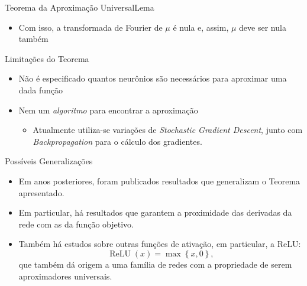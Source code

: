 \documentclass[13pt]{beamer}
\begin{document}
\begin{frame}{Teorema da Aproximação Universal}{Lema}
    \begin{itemize}
        \item Com isso, a transformada de Fourier de \( \mu \) é nula e, assim, \( \mu \) deve ser nula também
    \end{itemize}
\end{frame}


\begin{frame}{Limitações do Teorema}
    \begin{itemize}
        \item<1-> Não é especificado quantos neurônios são necessários para aproximar uma dada função
        \item<2-> Nem um \emph{algoritmo} para encontrar a aproximação
            \begin{itemize}
                \item<3-> Atualmente utiliza-se variações de \emph{Stochastic Gradient Descent}, junto com \emph{Backpropagation} para o cálculo dos gradientes.
            \end{itemize}
    \end{itemize}
\end{frame}


\begin{frame}{Possíveis Generalizações}
    \begin{itemize}
        \item<1-> Em anos posteriores, foram publicados resultados que generalizam o Teorema apresentado.
        \item<2-> Em particular, há resultados que garantem a proximidade das derivadas da rede com as da função objetivo.
        \item<3-> Também há estudos sobre outras funções de ativação, em particular, a ReLU:
            \begin{equation*}
                \operatorname{ReLU} ( x ) = \max \left\{ x, 0 \right\}
            ,\end{equation*}
            que também dá origem a uma família de redes com a propriedade de serem aproximadores universais.
    \end{itemize}
\end{frame}
\end{document}
